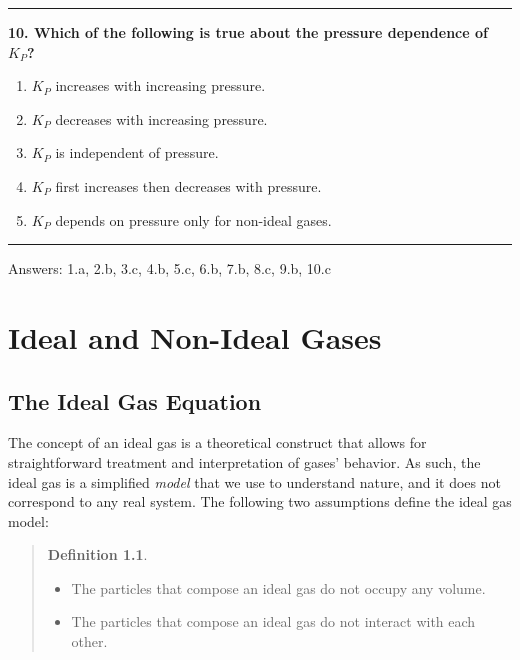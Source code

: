 \documentclass[
  9pt,
]{extbook}
\providecommand{\tightlist}{%
  \setlength{\itemsep}{0pt}\setlength{\parskip}{0pt}}
\theoremstyle{definition}
\newtheorem{definition}{Definition}[chapter]
\theoremstyle{definition}
\theoremstyle{definition}
\theoremstyle{remark}
\begin{document}
\begin{center}\rule{0.5\linewidth}{0.5pt}\end{center}

\textbf{10. Which of the following is true about the pressure dependence of \(K_P\)?}

\begin{enumerate}
\def\labelenumi{\alph{enumi}.}
\tightlist
\item
  \(K_P\) increases with increasing pressure.
\item
  \(K_P\) decreases with increasing pressure.
\item
  \(K_P\) is independent of pressure.
\item
  \(K_P\) first increases then decreases with pressure.
\item
  \(K_P\) depends on pressure only for non-ideal gases.
\end{enumerate}

\begin{center}\rule{0.5\linewidth}{0.5pt}\end{center}

Answers: 1.a, 2.b, 3.c, 4.b, 5.c, 6.b, 7.b, 8.c, 9.b, 10.c

\renewcommand*{\standardstate}{{-\kern-6pt{\ominus}\kern-6pt-}}

\hypertarget{RealGases}{%
\chapter{Ideal and Non-Ideal Gases}\label{RealGases}}

\hypertarget{the-ideal-gas-equation}{%
\section{The Ideal Gas Equation}\label{the-ideal-gas-equation}}

The concept of an ideal gas is a theoretical construct that allows for straightforward treatment and interpretation of gases' behavior. As such, the ideal gas is a simplified \emph{model} that we use to understand nature, and it does not correspond to any real system. The following two assumptions define the ideal gas model:

\begin{quote}
\begin{definition}
\protect\hypertarget{def:iedalgasdef}{}{\label{def:iedalgasdef} }

\begin{itemize}
\tightlist
\item
  The particles that compose an ideal gas do not occupy any volume.
\item
  The particles that compose an ideal gas do not interact with each other.
\end{itemize}
\end{definition}
\end{quote}
\end{document}
